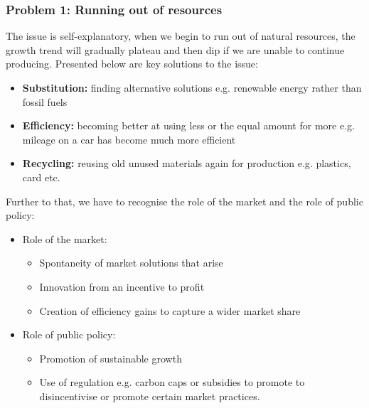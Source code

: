\documentclass[12pt, letterpaper]{article}
\begin{document}
\subsubsection{Problem 1: Running out of resources}
The issue is self-explanatory, when we begin to run out of natural resources, the growth trend will gradually plateau and then dip if we are unable to continue producing. Presented below are key solutions to the issue:
\begin{itemize}
	\item \textbf{Substitution:} finding alternative solutions e.g. renewable energy rather than fossil fuels
	\item \textbf{Efficiency:} becoming better at using less or the equal amount for more e.g. mileage on a car has become much more efficient
	\item \textbf{Recycling:} reusing old unused materials again for production e.g. plastics, card etc.
\end{itemize}
Further to that, we have to recognise the role of the market and the role of public policy:
\begin{itemize}
	\item Role of the market:
		\begin{itemize}
		\item Spontaneity of market solutions that arise
		\item Innovation from an incentive to profit
		\item Creation of efficiency gains to capture a wider market share
		\end{itemize}
	\item Role of public policy:
		\begin{itemize}
		\item Promotion of sustainable growth
		\item Use of regulation e.g. carbon caps or subsidies to promote to disincentivise or promote certain market practices.
		\end{itemize}
\end{itemize}
\end{document}
